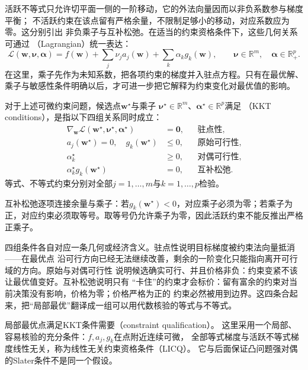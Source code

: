 活跃不等式只允许切平面一侧的一阶移动，它的外法向量因而以非负系数参与梯度平衡；
不活跃约束在该点留有严格余量，不限制足够小的移动，对应系数应为零。这分别引出
非负乘子与互补松弛。在适当的约束资格条件下，这些几何关系可通过
（Lagrangian）统一表达：
\[
  \mathcal{L}(\bm{w},\bm{\nu},\bm{\alpha})
  =f(\bm{w})+\sum_j\nu_j a_j(\bm{w})
  +\sum_k\alpha_k g_k(\bm{w}),
  \qquad
  \bm{\nu}\in\mathbb{R}^m,\quad
  \bm{\alpha}\in\mathbb{R}_+^p.
\]
在这里，乘子先作为未知系数，把各项约束的梯度并入驻点方程。只有在最优解、乘子与敏感性条件明确以后，才可进一步把它解释为约束变化对最优值的影响。

\begin{definition}[KKT条件]
\label{def:opt-kkt-conditions}
对于上述可微约束问题，候选点$\bm w^\star$与乘子
$\bm\nu^\star\in\mathbb R^m$、$\bm\alpha^\star\in\mathbb R^p$满足
（KKT conditions），是指以下四组关系同时成立：
\begin{align}
  \nabla_{\bm{w}}\mathcal{L}(\bm{w}^{\star},\bm{\nu}^{\star},
  \bm{\alpha}^{\star})&=\bm{0},
  &&\text{驻点性},\label{eq:opt-kkt-stationarity}\\
  a_j(\bm{w}^{\star})=0,\quad g_k(\bm{w}^{\star})&\leq0,
  &&\text{原始可行性},\\
  \alpha_k^{\star}&\geq0,
  &&\text{对偶可行性},\\
  \alpha_k^{\star}g_k(\bm{w}^{\star})&=0,
  &&\text{互补松弛}.\label{eq:opt-kkt-complementarity}
\end{align}
等式、不等式约束分别对全部$j=1,\ldots,m$与$k=1,\ldots,p$检验。
\end{definition}
互补松弛逐项连接余量与乘子：若$g_k(\bm w^\star)<0$，对应乘子必须为零；若乘子为正，对应约束必须取等号。取等号仍允许乘子为零，因此活跃约束不能反推出严格正乘子。

四组条件各自对应一条几何或经济含义。驻点性说明目标梯度被约束法向量抵消——在最优点
沿可行方向已经无法继续改善，剩余的一阶变化只能指向离开可行域的方向。原始与对偶可行性
说明候选确实可行、并且价格非负：约束变紧不该让最优值变好。互补松弛说明只有
“卡住”的约束才会标价：留有富余的约束对当前决策没有影响，价格为零；价格严格为正的
约束必然被用到边界。这四条合起来，把“局部最优”翻译成一组可以用代数核验的等式与不等式。

局部最优点满足KKT条件需要（constraint qualification）。
这里采用一个局部、容易核验的充分条件：$f,a_j,g_k$在点附近连续可微，
全部等式梯度与活跃不等式梯度线性无关，称为线性无关约束资格条件（LICQ）。
它与后面保证凸问题强对偶的Slater条件不是同一个假设。

